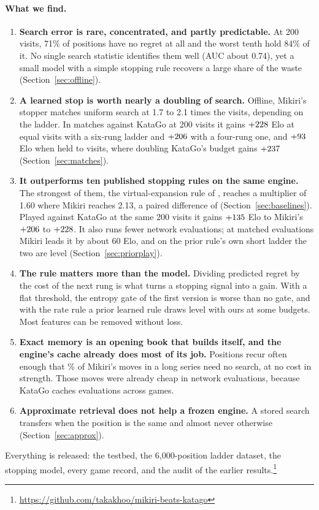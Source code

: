\paragraph{What we find.}
\begin{enumerate}
\item \textbf{Search error is rare, concentrated, and partly predictable.} At 200 visits, 71\% of positions have no regret at all and the worst tenth hold 84\% of it. No single search statistic identifies them well (AUC about 0.74), yet a small model with a simple stopping rule recovers a large share of the waste (Section~\ref{sec:offline}).
\item \textbf{A learned stop is worth nearly a doubling of search.} Offline, Mikiri's stopper matches uniform search at 1.7 to 2.1 times the visits, depending on the ladder. In matches against KataGo at 200 visits it gains $+228$ Elo at equal visits with a six-rung ladder and $+206$ with a four-rung one, and $+93$ Elo when held to \strictVisits{} visits, where doubling KataGo's budget gains $+237$ (Section~\ref{sec:matches}).
\item \textbf{It outperforms ten published stopping rules on the same engine.} The strongest of them, the virtual-expansion rule of \citet{ye2022spending}, reaches a multiplier of 1.60 where Mikiri reaches 2.13, a paired difference of \pairedVmctsTwo{} (Section~\ref{sec:baselines}). Played against KataGo at the same 200 visits it gains $+135$ Elo to Mikiri's $+206$ to $+228$. It also runs fewer network evaluations; at matched evaluations Mikiri leads it by about 60 Elo, and on the prior rule's own short ladder the two are level (Section~\ref{sec:priorplay}).
\item \textbf{The rule matters more than the model.} Dividing predicted regret by the cost of the next rung is what turns a stopping signal into a gain. With a flat threshold, the entropy gate of the first version is worse than no gate, and with the rate rule a prior learned rule draws level with ours at some budgets. Most features can be removed without loss.
\item \textbf{Exact memory is an opening book that builds itself, and the engine's cache already does most of its job.} Positions recur often enough that \memonlyHitRate\% of Mikiri's moves in a long series need no search, at no cost in strength. Those moves were already cheap in network evaluations, because KataGo caches evaluations across games.
\item \textbf{Approximate retrieval does not help a frozen engine.} A stored search transfers when the position is the same and almost never otherwise (Section~\ref{sec:approx}).
\end{enumerate}

Everything is released: the testbed, the 6{,}000-position ladder dataset, the stopping model, every game record, and the audit of the earlier results.\footnote{\url{https://github.com/takakhoo/mikiri-beats-katago}}
